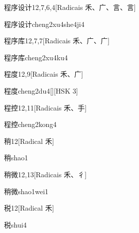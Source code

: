 \begin{entry}{程序设计}{12,7,6,4}[Radicais ⽲、⼴、⾔、⾔]
  \begin{phonetics}{程序设计}{cheng2xu4she4ji4}
  \end{phonetics}
\end{entry}

\begin{entry}{程序库}{12,7,7}[Radicais ⽲、⼴、⼴]
  \begin{phonetics}{程序库}{cheng2xu4ku4}
  \end{phonetics}
\end{entry}

\begin{entry}{程度}{12,9}[Radicais ⽲、⼴]
  \begin{phonetics}{程度}{cheng2du4}[][HSK 3]
  \end{phonetics}
\end{entry}

\begin{entry}{程控}{12,11}[Radicais ⽲、⼿]
  \begin{phonetics}{程控}{cheng2kong4}
  \end{phonetics}
\end{entry}

\begin{entry}{稍}{12}[Radical ⽲]
  \begin{phonetics}{稍}{shao1}
  \end{phonetics}
\end{entry}

\begin{entry}{稍微}{12,13}[Radicais ⽲、⼻]
  \begin{phonetics}{稍微}{shao1wei1}
  \end{phonetics}
\end{entry}

\begin{entry}{税}{12}[Radical ⽲]
  \begin{phonetics}{税}{shui4}
  \end{phonetics}
\end{entry}

